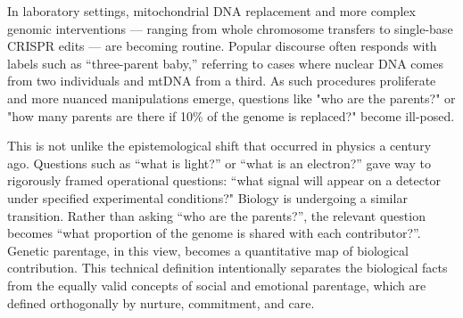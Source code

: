 \begin{commentary}
In laboratory settings, mitochondrial DNA replacement and more complex genomic interventions — ranging from whole chromosome transfers to single-base CRISPR edits — are becoming routine. Popular discourse often responds with labels such as “three-parent baby,” referring to cases where nuclear DNA comes from two individuals and mtDNA from a third. As such procedures proliferate and more nuanced manipulations emerge, questions like "who are the parents?" or "how many parents are there if 10\% of the genome is replaced?" become ill-posed.

This is not unlike the epistemological shift that occurred in physics a century ago. Questions such as “what is light?” or “what is an electron?” gave way to rigorously framed operational questions: “what signal will appear on a detector under specified experimental conditions?" Biology is undergoing a similar transition. Rather than asking “who are the parents?”, the relevant question becomes “what proportion of the genome is shared with each contributor?”. Genetic parentage, in this view, becomes a quantitative map of biological contribution. This technical definition intentionally separates the biological facts from the equally valid concepts of social and emotional parentage, which are defined orthogonally by nurture, commitment, and care.
\end{commentary}
\clearpage


